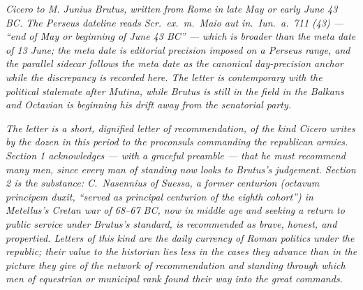 
\textit{Cicero to M. Junius Brutus, written from Rome
in late May or early June 43 BC. The Perseus dateline
reads \textit{Scr.\ ex.\ m.\ Maio aut in.\ Iun.\ a.\ 711
(43)} --- ``end of May or beginning of June 43 BC'' ---
which is broader than the meta date of 13 June; the
meta date is editorial precision imposed on a Perseus
range, and the parallel sidecar follows the meta date
as the canonical day-precision anchor while the
discrepancy is recorded here. The letter is contemporary
with the political stalemate after Mutina, while Brutus
is still in the field in the Balkans and Octavian is
beginning his drift away from the senatorial party.}

\textit{The letter is a short, dignified letter of
recommendation, of the kind Cicero writes by the dozen
in this period to the proconsuls commanding the
republican armies. Section 1 acknowledges --- with a
graceful preamble --- that he must recommend many men,
since every man of standing now looks to Brutus's
judgement. Section 2 is the substance: C.\ Nasennius
of Suessa, a former centurion (\textit{octavum
principem duxit}, ``served as principal centurion of
the eighth cohort'') in Metellus's Cretan war of 68--67
BC, now in middle age and seeking a return to public
service under Brutus's standard, is recommended as
brave, honest, and propertied. Letters of this kind
are the daily currency of Roman politics under the
republic; their value to the historian lies less in
the cases they advance than in the picture they give
of the network of recommendation and standing through
which men of equestrian or municipal rank found their
way into the great commands.}
